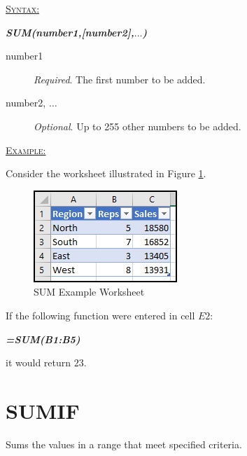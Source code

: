 \begin{addmargin}[1cm]{0cm}
	
	\medskip
	\underline{\textsc{Syntax:}}
	\medskip
	
	{\color{Syntax}
		\noindent\textbf{\textit{SUM(number1,[number2],$\ldots$)}}
	}
	
	\begin{description}
		\item[number1] \textit{Required}. The first number to be added.
		\item[number2, $\ldots$] \textit{Optional}. Up to 255 other numbers to be added.
	\end{description}

	\medskip
	\noindent\underline{\textsc{Example:}}
	\medskip
	
	\noindent Consider the worksheet illustrated in Figure \ref{apa:sum}.
	
	\begin{figure}[H]
		\centering
		\includegraphics[width=\maxwidth{.45\linewidth}]{gfx/apa_fig01}
		\caption{SUM Example Worksheet}
		\label{apa:sum}
	\end{figure}
	
	\noindent If the following function were entered in cell $ E2 $:
	
	{\color{Syntax}
		\textit{\textbf{=SUM(B1:B5)}}
	}
	
	\noindent it would return $ 23 $.

\end{addmargin}

\section{SUMIF}

Sums the values in a range that meet specified criteria. 

